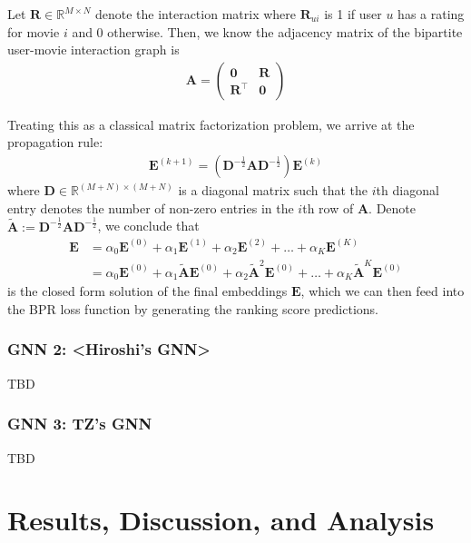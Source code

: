 \documentclass{article}
\begin{document}
Let $\mathbf{R} \in \mathbb{R}^{M \times N}$ denote the interaction matrix where $\mathbf{R}_{ui}$ is 1 if user $u$ has a rating for movie $i$ and 0 otherwise. Then, we know the adjacency matrix of the bipartite user-movie interaction graph is
\begin{align*}
    \mathbf{A} =
    \begin{pmatrix}
    \mathbf{0} & \mathbf{R} \\
    \mathbf{R}^\top & \mathbf{0}
    \end{pmatrix}
\end{align*}

Treating this as a classical matrix factorization problem, we arrive at the propagation rule:
\begin{align*}
    \mathbf{E}^{(k+1)} = \left( \mathbf{D}^{-\frac{1}{2}} \mathbf{A} \mathbf{D}^{-\frac{1}{2}} \right) \mathbf{E}^{(k)}
\end{align*}
where $\mathbf{D} \in \mathbb{R}^{(M + N) \times (M + N)}$ is a diagonal matrix such that the $i$th diagonal entry denotes the number of non-zero entries in the $i$th row of $\mathbf{A}$. Denote $\mathbf{\tilde{A}} := \mathbf{D}^{-\frac{1}{2}} \mathbf{A} \mathbf{D}^{-\frac{1}{2}}$, we conclude that
\begin{align*}
\mathbf{E} &= \alpha_0 \mathbf{E}^{(0)} + \alpha_1 \mathbf{E}^{(1)} + \alpha_2 \mathbf{E}^{(2)} + \hdots + \alpha_K \mathbf{E}^{(K)} \\
&= \alpha_0 \mathbf{E}^{(0)} + \alpha_1 \mathbf{\tilde{A}} \mathbf{E}^{(0)} + \alpha_2 \mathbf{\tilde{A}}^2 \mathbf{E}^{(0)} + \hdots + \alpha_K \mathbf{\tilde{A}}^K \mathbf{E}^{(0)}
\end{align*}
is the closed form solution of the final embeddings $\mathbf{E}$, which we can then feed into the BPR loss function by generating the ranking score predictions.

\subsubsection{GNN 2: <Hiroshi's GNN>}

TBD

\subsubsection{GNN 3: TZ's GNN}

TBD

\section{Results, Discussion, and Analysis} \label{results}
\end{document}
